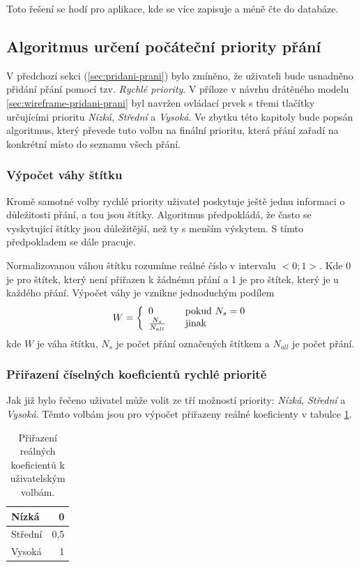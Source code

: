 Toto řešení se hodí pro aplikace, kde se více zapisuje a méně čte do databáze.

\subsection{Algoritmus určení počáteční priority přání}
V předchozí sekci (\ref{sec:pridani-prani}) bylo zmíněno, že uživateli bude usnadněno přidání přání pomocí tzv. \emph{Rychlé priority}. V příloze v návrhu drátěného modelu \ref{sec:wireframe-pridani-prani} byl navržen ovládací prvek s třemi tlačítky určujícími prioritu \emph{Nízká}, \emph{Střední} a \emph{Vysoká}. Ve zbytku této kapitoly bude popsán algoritmus, který převede tuto volbu na finální prioritu, která přání zařadí na konkrétní místo do seznamu všech přání.

\subsubsection{Výpočet váhy štítku}
Kromě samotné volby rychlé priority uživatel poskytuje ještě jednu informaci o důležitosti přání, a tou jsou štítky. Algoritmus předpokládá, že často se vyskytující štítky jsou důležitější, než ty s menším výskytem. S tímto předpokladem se dále pracuje.

Normalizovanou váhou štítku rozumíme reálné číslo v intervalu $<0;1>$. Kde 0 je pro štítek, který není přiřazen k žádnému přání a 1 je pro štítek, který je u každého přání. Výpočet váhy je vznikne jednoduchým podílem
\begin{equation}
W = \left\{
  \begin{array}{l l}
    0 & \quad \text{pokud }N_s = 0\\
    \frac{N_s}{N_{all}} & \quad \text{jinak}
  \end{array} \right.
\label{eq:vaha-stitku}
\end{equation}
kde $W$ je váha štítku, $N_s$ je počet přání označených štítkem a $N_{all}$ je počet přání.

\subsubsection{Přiřazení číselných koeficientů rychlé prioritě}
Jak již bylo řečeno uživatel může volit ze tří možností priority: \emph{Nízká}, \emph{Střední} a \emph{Vysoká}. Těmto volbám jsou pro výpočet přiřazeny reálné koeficienty v tabulce \ref{tab:rychla-priorita}.

\begin{table}[htb]
\begin{center}
\begin{tabular}{|l|r|}
\hline
Nízká & 0\\ \hline
Střední & 0,5\\ \hline
Vysoká & 1 \\
\hline
\end{tabular}
\caption{Přiřazení reálných koeficientů k uživatelským volbám.}
\label{tab:rychla-priorita}
\end{center}
\end{table}

